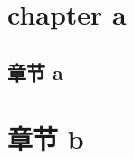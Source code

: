 \documentclass[openright, oneside]{gdutthesis}
\begin{document}
\frontmatter %

\mainmatter%

\chapter{chapter a}
\translateenglish%
\lipsum%
%

\begin{abstract}{chinese,projecttype=false}
  \translatechinese%
  \zhlipsum[1]
\end{abstract}

\begin{nocleardoublepage}
\chapter{章节 a}
\end{nocleardoublepage}
\zhlipsum[1-4]

\chapter{章节 b}
\zhlipsum[1-4]
\end{document}
